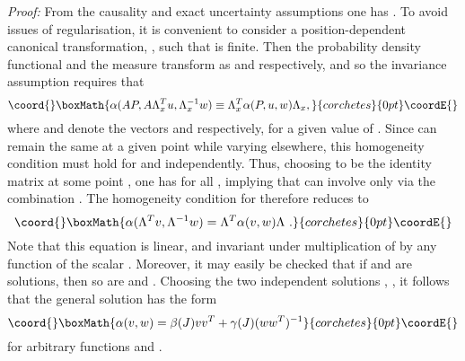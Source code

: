 \documentclass[a4paper,preprint, showpacs, aps, draft]{revtex4}
\begin{document}
{{\it Proof:} From the causality and exact uncertainty assumptions 
one has \coordHE{}.  To
avoid issues of regularisation, it is convenient to consider a 
position-dependent canonical transformation, \coordHE{}, such that \coordHE{} is
finite. Then the probability density functional  
\coordHE{} and the measure \coordHE{} transform as \coordHE{} and
\coordHE{} respectively, and so the 
invariance assumption requires that
\[\coord{}\boxMath{
\alpha(AP, A\Lambda_x^Tu, \Lambda_x^{-1}w) \equiv 
\Lambda_x^T\alpha(P,u,w)\Lambda_x , }{corchetes}{0pt}\coordE{}\]
where \coordHE{} and \coordHE{} denote the vectors \coordHE{} and
\coordHE{} respectively, for a given value of \coordHE{}.
Since \coordHE{} can remain the same at a given point \coordHE{} while varying
elsewhere, this homogeneity condition must hold for \coordHE{} and \coordHE{}
independently.  Thus, choosing \coordHE{} to be the identity matrix at
some point \coordHE{}, one has \coordHE{} for all \coordHE{},
implying that \myHighlight{$\alpha$}\coordHE{} can involve \coordHE{} only 
via the combination \coordHE{}.
The homogeneity condition for \myHighlight{$\alpha$}\coordHE{} therefore reduces to
\[\coord{}\boxMath{ 
\alpha(\Lambda^Tv, \Lambda^{-1}w) = \Lambda^T\alpha(v,w)\Lambda~.}{corchetes}{0pt}\coordE{}\]
Note that this equation is linear, and invariant under multiplication of
\myHighlight{$\alpha$}\coordHE{} by any function of the scalar \coordHE{}.  Moreover, it may
easily be checked that if \myHighlight{$\sigma$}\coordHE{} and \myHighlight{$\tau$}\coordHE{} are solutions, then so are
\coordHE{} and \coordHE{}. Choosing the two
independent solutions \coordHE{}, \coordHE{}, it follows that
the general solution has the form
\[\coord{}\boxMath{
\alpha(v,w) = \beta(J)vv^T + \gamma(J)(ww^T)^{-1} }{corchetes}{0pt}\coordE{}\]
for arbitrary functions \myHighlight{$\beta$}\coordHE{} and \myHighlight{$\gamma$}\coordHE{}.
}
\end{document}
